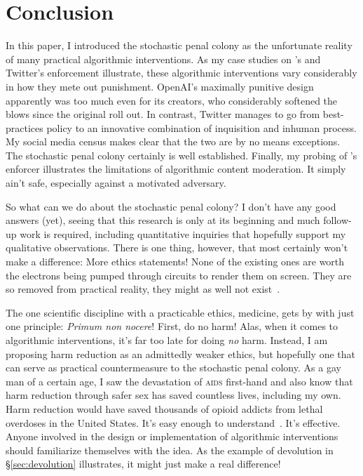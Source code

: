 \section{Conclusion}
\label{sec:conclusion}

In this paper, I introduced the stochastic penal colony as the unfortunate
reality of many practical algorithmic interventions. As my case studies on
\DALLE's and Twitter's enforcement illustrate, these algorithmic interventions
vary considerably in how they mete out punishment. OpenAI's maximally punitive
design apparently was too much even for its creators, who considerably softened
the blows since the original roll out. In contrast, Twitter manages to go from
best-practices policy to an innovative combination of inquisition and inhuman
process. My social media census makes clear that the two are by no means
exceptions. The stochastic penal colony certainly is well established. Finally,
my probing of \DALLE's enforcer illustrates the limitations of algorithmic
content moderation. It simply ain't safe, especially against a motivated
adversary.

So what can we do about the stochastic penal colony? I don't have any good
answers (yet), seeing that this research is only at its beginning and much
follow-up work is required, including quantitative inquiries that hopefully
support my qualitative observations. There is one thing, however, that most
certainly won't make a difference: More  ethics statements! None of the
existing ones are worth the electrons being pumped through circuits to render
them on screen. They are so removed from practical reality, they might as well
not exist~\cite{Hagendorff2022,Munn2022,WhittlestoneNyrupea2019}.

The one scientific discipline with a practicable ethics, medicine, gets by with
just one principle: \emph{Primum non nocere}! First, do no harm! Alas, when it
comes to algorithmic interventions, it's far too late for doing \emph{no} harm.
Instead, I am proposing harm reduction as an admittedly weaker  ethics, but
hopefully one that can serve as practical countermeasure to the stochastic penal
colony. As a gay man of a certain age, I saw the devastation of \textsc{aids}
first-hand and also know that harm reduction through safer sex has saved
countless lives, including my own. Harm reduction would have saved thousands of
opioid addicts from lethal overdoses in the United States. It's easy enough to
understand~\cite{HRI2020,HRI2022,Interlandi2023,MarlattLarimerea2011,OpenSocietyFoundations2021}.
It's effective. Anyone involved in the design or implementation of algorithmic
interventions should familiarize themselves with the idea. As the example of
devolution in \S\ref{sec:devolution} illustrates, it might just make a
real difference!
